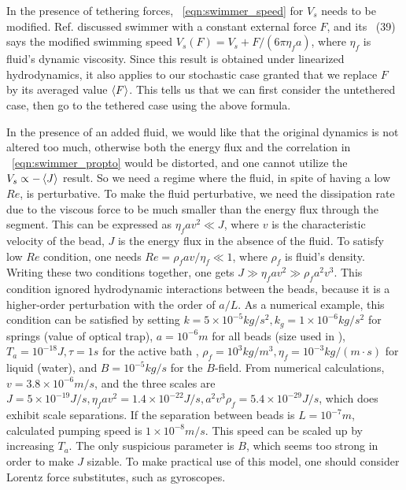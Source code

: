 \documentclass[
 preprint,
 preprintnumbers,
 amsmath,amssymb,
 aps,
 pre,
 longbibliography,
 superscriptaddress,
 10pt, twocolumn
]{revtex4-1}
\begin{document}
In the presence of tethering forces, \eqnname~\eqref{eqn:swimmer_speed} for $V_s$ needs to be modified.
Ref. \cite{Golestanian2008AnalyticResults} discussed swimmer with a constant external force $F$, and its \eqnname~(39) says the modified swimming speed $V_s(F) = V_s + F/(6\pi\eta_f a)$, where $\eta_f$ is fluid's dynamic viscosity.
Since this result is obtained under linearized hydrodynamics, it also applies to our stochastic case granted that we replace $F$ by its averaged value $\expval{F}$.
This tells us that we can first consider the untethered case, then go to the tethered case using the above formula.

In the presence of an added fluid, we would like that the original dynamics is not altered too much, otherwise both the energy flux and the correlation in \eqnname~\eqref{eqn:swimmer_propto} would be distorted, and one cannot utilize the $V_s \propto -\expval{J}$ result.
So we need a regime where the fluid, in spite of having a low $Re$, is perturbative.
To make the fluid perturbative, we need the dissipation rate due to the viscous force to be much smaller than the energy flux through the segment. This can be expressed as $\eta_f a v^2 \ll J$, where $v$ is the characteristic velocity of the bead, $J$ is the energy flux in the absence of the fluid.
To satisfy low $Re$ condition, one needs $Re = \rho_f a v /\eta_f \ll 1$, where $\rho_f$ is fluid's density.
Writing these two conditions together, one gets $J \gg \eta_f a v^2 \gg \rho_f a^2 v^3$.
This condition ignored hydrodynamic interactions between the beads, because it is a higher-order perturbation with the order of $a/L$.
As a numerical example, this condition can be satisfied by setting $k=5\times 10^{-5} kg/s^2, k_g=1\times 10^{-6} kg/s^2$ for springs (value of optical trap), $a=10^{-6}m$ for all beads (size used in \cite{Leoni2009BasicSwimmer}), $T_a=10^{-18} J, \tau=1s$ for the active bath \cite{Wu2000ParticleDiffusion}, $\rho_f=10^3kg/m^3, \eta_f=10^{-3}kg/(m\cdot s)$ for liquid (water), and $B=10^{-5} kg/s$ for the $B$-field.
From numerical calculations, $v=3.8\times 10^{-6}m/s$, and the three scales are $J=5\times 10^{-19}J/s, \eta_f av^2=1.4\times 10^{-22}J/s, a^2v^3\rho_f=5.4\times 10^{-29}J/s$, which does exhibit scale separations.
If the separation between beads is $L=10^{-7}m$, calculated pumping speed is $1\times 10^{-8} m/s$.
This speed can be scaled up by increasing $T_a$.
The only suspicious parameter is $B$, which seems too strong in order to make $J$ sizable. To make practical use of this model, one should consider Lorentz force substitutes, such as gyroscopes.
\end{document}

